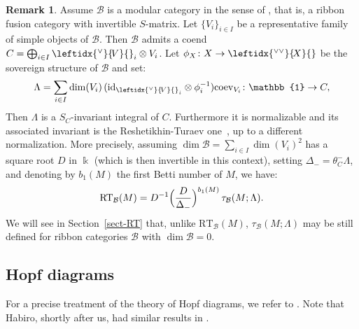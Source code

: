 \documentclass[a4paper]{amsart}
\theoremstyle{definition}
\newtheorem{rem}[thm]{Remark}
\newcommand{\co}{\colon}
\newcommand{\id}{\mathrm{id}}
\newcommand{\bb}{\mathcal{B}}
\newcommand{\un}{\mathbb{1}}
\newcommand{\lcoev}{\mathrm{coev}}
\newcommand{\ldual}[1]{\leftidx{^\vee}{\!#1}{}}
\newcommand{\lldual}[1]{\leftidx{^{\vee\vee}}{\!#1}{}}
\begin{document}
\begin{rem}\label{rem-invRT}
Assume $\bb$ is a modular category in the sense of \cite{Tur2}, that is, a ribbon fusion category with invertible
$S$-matrix. Let $\{V_i\}_{i\in I}$ be a representative family of simple objects of $\bb$. Then $\bb$ admits a coend
$C=\bigoplus_{i \in I} \ldual{V}_i \otimes V_i$. Let $\phi_X\co X \to \lldual{X}$ be the sovereign structure of $\bb$ and
set:
\begin{equation*}
\Lambda=\sum_{i \in I} \dim(V_i) \, (\id_{\ldual{V}_i} \otimes \phi_i^{-1}) \lcoev_{V_i} \co \un \to C,
\end{equation*}
Then $\Lambda$ is a $S_C$-invariant integral of $C$. Furthermore it is normalizable and its associated invariant is the
Reshetikhin-Turaev one~\cite{Tur2}, up to a different normalization. More precisely, assuming $\dim \bb=\sum_{i \in I}
\dim(V_i)^2$ has a square root $D$ in $\Bbbk$ (which is then invertible in this context), setting $\Delta_-=\theta^-_C
\Lambda$, and denoting by $b_1(M)$ the first Betti number of $M$, we have:
\begin{equation*}
\mathrm{RT}_\bb(M) = D^{-1} \Bigl(\frac{D}{\Delta_-}\Bigr)^{b_1(M)} \, \tau_\bb(M;\Lambda).
\end{equation*}
We will see in Section~\ref{sect-RT} that, unlike $\mathrm{RT}_\bb(M)$, $\tau_\bb(M;\Lambda)$ may be still defined for
ribbon categories $\bb$ with $\dim \bb=0$.
\end{rem}

\subsection{Hopf diagrams}\label{sect-Hdiag}
For a precise treatment of the theory of Hopf diagrams, we refer to \cite{BV1}. Note that Habiro, shortly after us, had
similar results in \cite{Hab1}.
\end{document}
